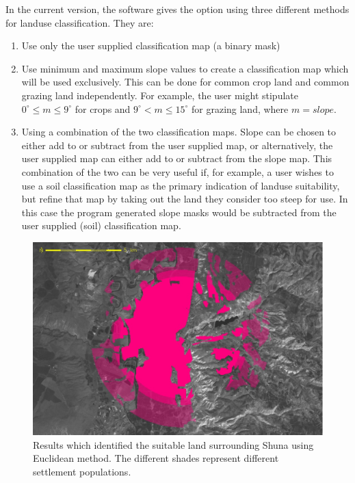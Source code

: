   In the current version, the software gives the option using three different
  methods for landuse classification.  They are: 
  \begin{enumerate} 
    \item  Use only the user supplied classification map (a binary mask) 
    \item  Use minimum and maximum slope values to create a classification map
      which will be used exclusively.  This can be done for common crop land and
      common grazing land independently.  For example, the user might stipulate
      $0^\circ \leq m \leq 9^\circ$ for crops and $9^\circ < m \leq 15^\circ$
      for grazing land, where $m=slope$.  
    \item  Using a combination of the two classification maps.  Slope can be
      chosen to either add to or subtract from the user supplied map, or 
      alternatively, the user supplied map can either add to or subtract from
      the slope map.  This combination of the two can be very useful if, for 
      example, a user wishes to use a soil classification map as the primary
      indication of landuse suitability, but refine that map by taking out the
      land they consider too steep for use. In this case the program generated
      slope masks would be subtracted from the user supplied (soil) classification map.  
  \end{enumerate}
  
\begin{figure}[htbp] %
  \includegraphics[scale=0.225]{./images/landcatchment.jpg}
  \caption{\label{fig:landCatchment}Results which identified the suitable land
    surrounding Shuna using Euclidean method. The different shades represent
different
    settlement populations.}
\end{figure}


